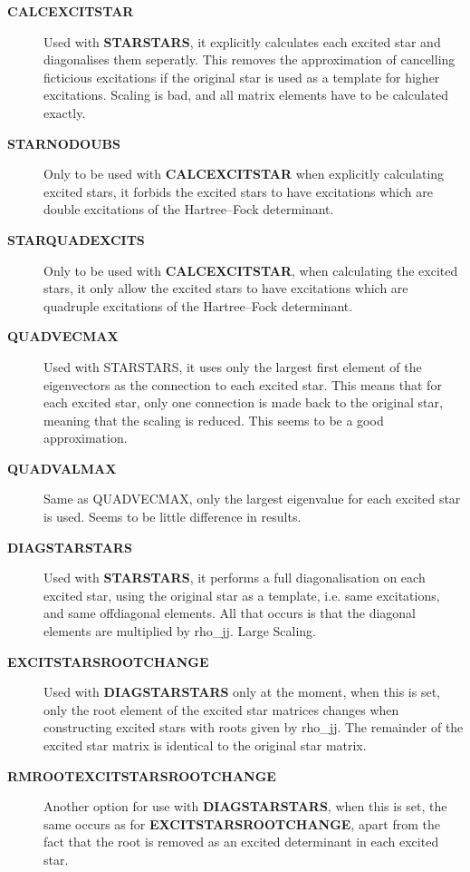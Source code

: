 \documentclass[openany,a4paper,10pt]{manual}
\begin{document}
\begin{description}
\item[\textbf{CALCEXCITSTAR}]
Used with \textbf{STARSTARS}, it explicitly calculates each excited star
and diagonalises them seperatly. This removes the approximation of
cancelling ficticious excitations if the original star is used as
a template for higher excitations. Scaling is bad, and all matrix
elements have to be calculated exactly.

\item[\textbf{STARNODOUBS}]
Only to be used with \textbf{CALCEXCITSTAR} when explicitly calculating
excited stars, it forbids the excited stars to have excitations
which are double excitations of the Hartree--Fock determinant.

\item[\textbf{STARQUADEXCITS}]
Only to be used with \textbf{CALCEXCITSTAR}, when calculating the excited
stars, it only allow the excited stars to have excitations which
are quadruple excitations of the Hartree--Fock determinant.

\item[\textbf{QUADVECMAX}]
Used with STARSTARS, it uses only the largest first element of the
eigenvectors as the connection to each excited star. This means
that for each excited star, only one connection is made back to the
original star, meaning that the scaling is reduced. This seems to
be a good approximation.

\item[\textbf{QUADVALMAX}]
Same as QUADVECMAX, only the largest eigenvalue for each excited
star is used. Seems to be little difference in results.

\item[\textbf{DIAGSTARSTARS}]
Used with \textbf{STARSTARS}, it performs a full diagonalisation on
each excited star, using the original star as a template, i.e. same
excitations, and same offdiagonal elements. All that occurs is that
the diagonal elements are multiplied by rho\_jj. Large Scaling.

\item[\textbf{EXCITSTARSROOTCHANGE}]
Used with \textbf{DIAGSTARSTARS} only at the moment, when this is set,
only the root element of the excited star matrices changes when
constructing excited stars with roots given by rho\_jj. The remainder
of the excited star matrix is identical to the original star matrix.

\item[\textbf{RMROOTEXCITSTARSROOTCHANGE}]
Another option for use with \textbf{DIAGSTARSTARS}, when this is set, the
same occurs as for \textbf{EXCITSTARSROOTCHANGE}, apart from the fact that
the root is removed as an excited determinant in each excited star.

\end{description}
\end{document}

